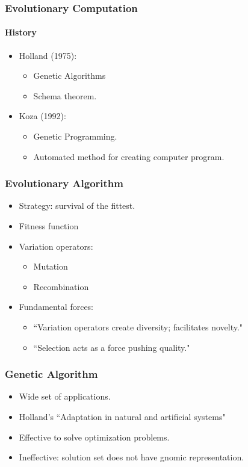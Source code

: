 \frame
{
	\frametitle{Evolutionary Computation}
	\framesubtitle{History}

	\begin{itemize}
		\item Holland (1975):
			\begin{itemize}
				\item Genetic Algorithms
				\item Schema theorem.
			\end{itemize}
		\item Koza (1992):
			\begin{itemize}
				\item Genetic Programming.
				\item Automated method for creating computer program.
			\end{itemize}
	\end{itemize}
}

\frame
{
	\frametitle{Evolutionary Algorithm}

	\begin{itemize}
		\item Strategy: survival of the fittest.
		\item Fitness function
		\item Variation operators:
			\begin{itemize}
				\item Mutation
				\item Recombination
			\end{itemize}
		\item Fundamental forces:
			\begin{itemize}
					\item ``Variation operators create diversity; facilitates novelty."
					\item ``Selection acts as a force pushing quality."
			\end{itemize}
	\end{itemize}
}

\frame
{
	\frametitle{Genetic Algorithm}

	\begin{itemize}
		\item Wide set of applications.
		\item Holland's ``Adaptation in natural and artificial systems"
		\item Effective to solve optimization problems.
		\item Ineffective: solution set does not have gnomic representation.
	\end{itemize}
}

